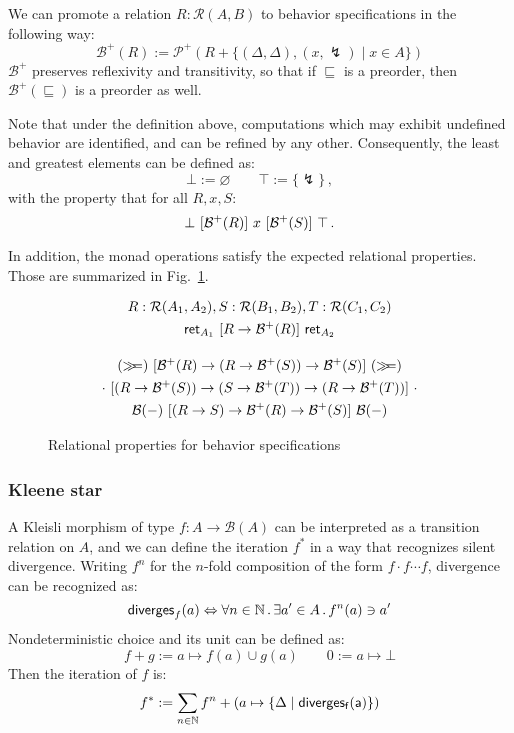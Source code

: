 We can promote a relation $R : \mathcal{R}(A, B)$
to behavior specifications in the following way:
\[ \mathcal{B}^+(R) :=
   \mathcal{P}^+(R + \{ (\Delta, \Delta), (x, \lightning) \mid x \in A \}) \]
$\mathcal{B}^+$ preserves reflexivity and transitivity,
so that if $\sqsubseteq$ is a preorder,
then $\mathcal{B}^+(\sqsubseteq)$ is a preorder as well.

Note that under the definition above,
computations which may exhibit undefined behavior
are identified,
and can be refined by any other.
Consequently,
the least and greatest elements
can be defined as:
\[ \bot := \varnothing \qquad \top := \{ \lightning \} \,, \]
with the property that for all $R, x, S$:
\[ \bot \ [{\mathcal{B}^+(R)}]\  x \ [{\mathcal{B}^+(S)}]\  \top \,. \]

In addition,
the monad operations satisfy the expected relational properties.
Those are summarized in Fig.~\ref{fig:monadr}.

\begin{figure}
  \begin{gather*}
    R : \mathcal{R}(A_1, A_2),
    S : \mathcal{R}(B_1, B_2),
    T : \mathcal{R}(C_1, C_2) \\
    \vspace{1em}
    \kw{ret}_{A_1}
        \ifr{R \rightarrow \mathcal{B}^+(R)}
        \kw{ret}_{A_2} \\
    ({\bind})
        \ifr{\mathcal{B}^+(R) \rightarrow (R \rightarrow \mathcal{B}^+(S))
          \rightarrow \mathcal{B}^+(S)}
        ({\bind}) \\
    {\cdot}
        \ifr{(R \rightarrow \mathcal{B}^+(S)) \rightarrow
             (S \rightarrow \mathcal{B}^+(T)) \rightarrow
             (R \rightarrow \mathcal{B}^+(T))}
        {\cdot} \\
    \mathcal{B}(-)
        \ifr{(R \rightarrow S) \rightarrow
             \mathcal{B}^+(R) \rightarrow \mathcal{B}^+(S)}
        \mathcal{B}(-)
  \end{gather*}
  \caption{Relational properties for behavior specifications}
  \label{fig:monadr}
\end{figure}

\subsubsection{Kleene star}

A Kleisli morphism of type $f : A \rightarrow \mathcal{B}(A)$
can be interpreted as a transition relation on $A$,
and we can define the iteration $f^*$
in a way that recognizes silent divergence.
Writing $f^n$ for the $n$-fold composition of the form
$f \cdot f \cdots f$,
divergence can be recognized as:
\[  \mathsf{diverges} _f(a) \Leftrightarrow
    \forall n \in \mathbb{N} \,.\,
    \exists a' \in A \,.\,
    f^n(a) \ni a' \]
Nondeterministic choice
and its unit can be defined as:
\[ f + g := a \mapsto f(a) \cup g(a)  \qquad  0 := a \mapsto \bot \]
Then the iteration of $f$ is:
\[ f^* := \sum_{n \in \mathbb{N}} f^n +
          (a \mapsto \{ \Delta \mid  \mathsf{diverges_f(a)}  \}) \]

